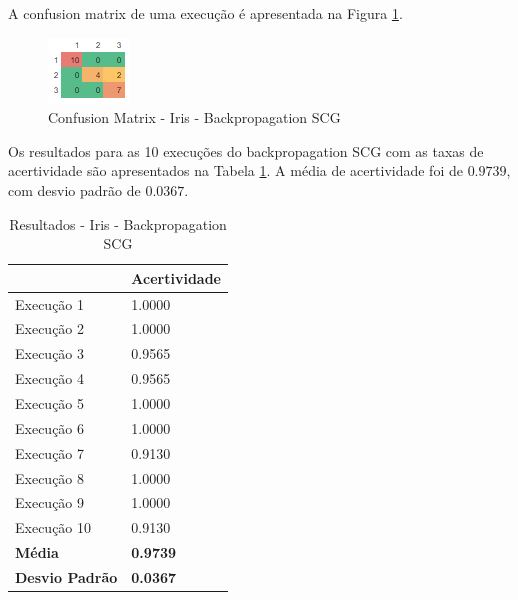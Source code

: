 A confusion matrix de uma execução é apresentada na Figura \ref{figura-confusion-matrix-iris-backpropagation-scg}.

\begin{figure}[h!]
  \centering
  \includegraphics[width=0.3\linewidth]{figs/confusion-matrix-iris-backpropagation-scg.png}
  \caption{Confusion Matrix - Iris - Backpropagation SCG}
  \label{figura-confusion-matrix-iris-backpropagation-scg}
\end{figure}

Os resultados para as 10 execuções do backpropagation SCG com as taxas de acertividade são apresentados na Tabela \ref{tabela-resultado-iris-backpropagation-scg}. A média de acertividade foi de $0.9739$, com desvio padrão de $0.0367$.

\begin{table}[h!]
\centering
\caption{Resultados - Iris - Backpropagation SCG}
\label{tabela-resultado-iris-backpropagation-scg}
\begin{tabular}{ll}
\toprule
                       & \textbf{Acertividade}       \\ \midrule
Execução 1             & 1.0000          \\
Execução 2             & 1.0000          \\
Execução 3             & 0.9565           \\
Execução 4             & 0.9565          \\
Execução 5             & 1.0000           \\
Execução 6             & 1.0000          \\
Execução 7             & 0.9130           \\
Execução 8             & 1.0000           \\
Execução 9             & 1.0000          \\
Execução 10            & 0.9130          \\ \bottomrule
\textbf{Média}         & \textbf{0.9739} \\
\textbf{Desvio Padrão} & \textbf{0.0367}
\end{tabular}
\end{table}

%
